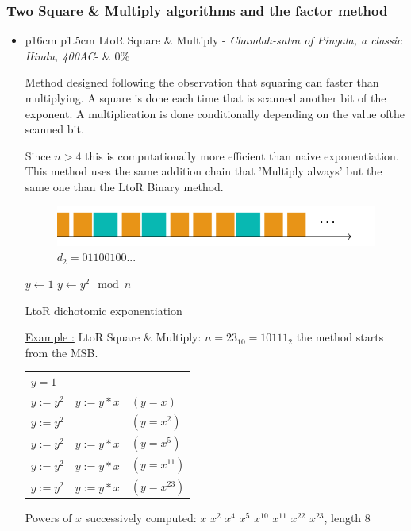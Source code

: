 \newpage
\subsubsection{Two Square \& Multiply algorithms and the factor method}

\begin{itemize}
\item  	\begin{tabularx}{\linewidth}{ p{16cm} p{1.5cm}}
		LtoR Square \& Multiply - 
		\textit{Chandah-sutra of Pingala, a classic Hindu, 400AC}-  & $0\%$ \\ 
		\end{tabularx}	
			\noindent
			Method designed following the observation that squaring can faster than multiplying.
			A square is done each time that is scanned another bit of the exponent.
			A multiplication is done conditionally depending on the value ofthe scanned bit.
						
			Since $n > 4$ this is computationally more efficient than naive exponentiation.
			This method uses the same addition chain that 'Multiply always' but the same one than the LtoR Binary method.\\	
			\begin{figure}[h]
				\begin{center}
				\includegraphics[scale=0.33]{images/SM.png}		
				\caption{$d_2 = 0 1 1 0 0 1 0 0 ... $}
				\end{center}
			\end{figure}	
			\begin{algorithm}[h]
				 $y \leftarrow 1$ \;
				{
				$y \leftarrow y^2 \mod n$\\				 
				}									 
				\;
				\caption{LtoR dichotomic exponentiation}
			\end{algorithm}	

			\underline{Example :} LtoR Square \& Multiply: $n=23_{10}=10111_2$ the method starts 
			from the MSB.
			
			\begin{tabularx}{\linewidth}{ p{2cm} p{12cm} p{2cm}}
				$y=1$ & $ $\\
				$y:=y^2$ & $y:=y*x$	& $(y=x)$\\		
				$y:=y^2$ &       	& $(y=x^2)$\\
				$y:=y^2$ & $y:=y*x$ & $(y=x^{5})$\\
				$y:=y^2$ & $y:=y*x$ & $(y=x^{11})$\\
				$y:=y^2$ & $y:=y*x$ & $(y=x^{23})$
			\end{tabularx}	
			Powers of $x$ successively computed:	
			$x$ $x^2$ $x^4$ $x^5$ $x^{10}$ $x^{11}$ $x^{22}$ $x^{23}$, length 8\\
			

\end{itemize}
